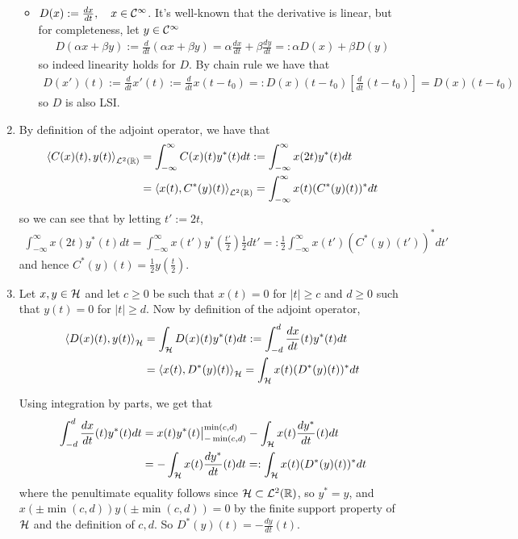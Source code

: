 \documentclass{article}
\makeatletter
\newcommand{\skipitems}[1]{%
  \addtocounter{\@enumctr}{#1}%
}
\makeatother
\begin{document}
\begin{enumerate}[label=(\roman*)]
\begin{itemize}
            \item $D(x):=\frac{dx}{dt},\quad x\in \mathcal{C}^\infty$. It's well-known that the derivative is linear, but for completeness, let $y\in \mathcal{C}^\infty$
            \begin{align}
                D(\alpha x + \beta y) := \frac{d}{dt}(\alpha x + \beta y) = \alpha \frac{dx}{dt} + \beta \frac{dy}{dt} =: \alpha D(x) + \beta D(y)
            \end{align}
            so indeed linearity holds for $D$. By chain rule we have that
            \begin{align}
                D(x')(t):=\frac{d}{dt}x'(t) := \frac{d}{dt}x(t-t_0) =:  D(x)(t-t_0) \left[\frac{d}{dt}(t-t_0)\right] =  D(x)(t-t_0)
            \end{align}
            so $D$ is also LSI.
        \end{itemize}
        
        \skipitems{1}
        \item By definition of the adjoint operator, we have that
        \begin{align}
            \left\langle C(x)(t),y(t) \right\rangle_{\mathcal{L}^2(\mathbb{R})} &= \int_{-\infty}^{\infty} C(x)(t)y^*(t) dt := \int_{-\infty}^{\infty} x(2t) y^*(t) dt \\
            &= \left\langle x(t),C^*(y)(t) \right\rangle_{\mathcal{L}^2(\mathbb{R})} = \int_{-\infty}^{\infty} x(t) (C^*(y)(t))^* dt
        \end{align}
        so we can see that by letting $t':=2t$,
        \begin{align}
            \int_{-\infty}^{\infty} x(2t) y^*(t) dt = \int_{-\infty}^{\infty} x(t') y^*\left(\frac{t'}{2}\right)\frac{1}{2} dt'=: \frac{1}{2}\int_{-\infty}^{\infty} x(t') (C^*(y)(t'))^* dt'
        \end{align}
        and hence $C^*(y)(t)=\frac{1}{2}y\left(\frac{t}{2}\right)$.
        \item Let $x,y\in \mathcal{H}$ and let $c\geq 0$ be such that $x(t)=0$ for $|t|\geq c$ and $d\geq 0$ such that $y(t)=0$ for $|t|\geq d$. Now by definition of the adjoint operator,
        \begin{align}
            \left\langle D(x)(t),y(t) \right\rangle_{\mathcal{H}} &= \int_{\mathcal{H}} D(x)(t)y^*(t) dt := \int_{-d }^{d} \frac{dx}{dt}(t) y^*(t) dt \\
            &= \left\langle x(t),D^*(y)(t) \right\rangle_{\mathcal{H}} = \int_{\mathcal{H}} x(t) (D^*(y)(t))^* dt
        \end{align}
        
        Using integration by parts, we get that
        \begin{align}
            \int_{-d }^{d} \frac{dx}{dt}(t) y^*(t) dt &=  x(t) y^*(t) \big\rvert_{-\min(c,d)}^{\min(c,d)} -  \int_{\mathcal{H}} x(t) \frac{dy^*}{dt}(t) dt \\
            &= -  \int_{\mathcal{H}} x(t) \frac{dy^*}{dt}(t) dt =: \int_{\mathcal{H}} x(t) (D^*(y)(t))^* dt
        \end{align}
        where the penultimate equality follows since $\mathcal{H}\subset \mathcal{L}^2(\mathbb{R})$, so $y^* = y$, and $x(\pm \min(c,d))y(\pm \min(c,d))=0$ by the finite support property of $\mathcal{H}$ and the definition of $c,d$. So $D^*(y)(t)=-\frac{dy}{dt}(t)$.
        

\end{enumerate}
\end{document}
